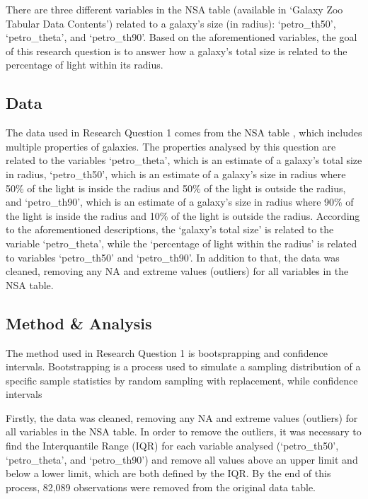 \documentclass[12pt]{article}
\begin{document}
There are three different variables in the NSA table (available in `Galaxy Zoo Tabular Data Contents') related to a galaxy's size (in radius): `petro\_th50', `petro\_theta', and `petro\_th90'. Based on the aforementioned variables, the goal of this research question is to answer how a galaxy's total size is related to the percentage of light within its radius.

\subsection{Data}

The data used in Research Question 1 comes from the NSA table \cite{NSA}, which includes multiple properties of galaxies. The properties analysed by this question are related to the variables `petro\_theta', which is an estimate of a galaxy's total size in radius, `petro\_th50', which is an estimate of a galaxy's size in radius where 50\% of the light is inside the radius and 50\% of the light is outside the radius, and `petro\_th90', which is an estimate of a galaxy's size in radius where 90\% of the light is inside the radius and 10\% of the light is outside the radius. According to the aforementioned descriptions, the `galaxy's total size' is related to the variable `petro\_theta', while the `percentage of light within the radius' is related to variables `petro\_th50' and `petro\_th90'. In addition to that, the data was cleaned, removing any NA and extreme values (outliers) for all variables in the NSA table.

\subsection{Method \& Analysis}

The method used in Research Question 1 is bootsprapping and confidence intervals. Bootstrapping is a process used to simulate a sampling distribution of a specific sample statistics by random sampling with replacement, while confidence intervals 

\noindent
Firstly, the data was cleaned, removing any NA and extreme values (outliers) for all variables in the NSA table. In order to remove the outliers, it was necessary to find the Interquantile Range (IQR) for each variable analysed (`petro\_th50', `petro\_theta', and `petro\_th90') and remove all values above an upper limit and below a lower limit, which are both defined by the IQR. By the end of this process, 82,089 observations were removed from the original data table.
\end{document}
